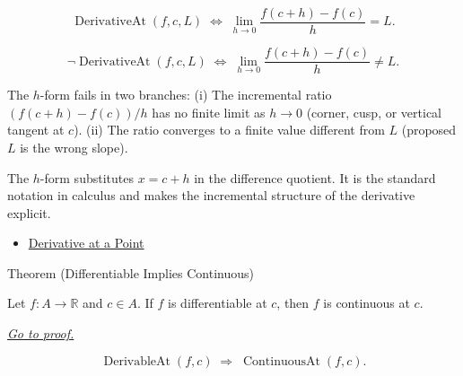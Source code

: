 \begin{remark*}
\[
\operatorname{DerivativeAt}(f,c,L)
\;\Longleftrightarrow\;
\lim_{h\to 0}\frac{f(c+h)-f(c)}{h} = L.
\]
\end{remark*}

\begin{remark*}
\[
\neg\operatorname{DerivativeAt}(f,c,L)
\;\Longleftrightarrow\;
\lim_{h\to 0}\frac{f(c+h)-f(c)}{h} \neq L.
\]
\end{remark*}

\begin{remark*}
The $h$-form fails in two branches: (i) The incremental ratio $(f(c+h)-f(c))/h$ has no finite limit as $h \to 0$ (corner, cusp, or vertical tangent at $c$). (ii) The ratio converges to a finite value different from $L$ (proposed $L$ is the wrong slope).
\end{remark*}

\begin{remark*}[Interpretation]
The $h$-form substitutes $x = c + h$ in the difference quotient. It is the standard notation in calculus and makes the incremental structure of the derivative explicit.
\end{remark*}

\begin{dependencies}
\begin{itemize}
  \item \hyperref[def:derivative-at-a-point]{Derivative at a Point}
\end{itemize}
\end{dependencies}


\begin{theorembox}{Theorem (Differentiable Implies Continuous)}
\begin{theorem}
\label{thm:differentiable-implies-continuous}
Let $f : A \to \mathbb{R}$ and $c \in A$. If $f$ is differentiable at $c$, then $f$ is continuous at $c$.

\smallskip\noindent
\hyperref[prf:differentiable-implies-continuous]{\textit{Go to proof.}}
\end{theorem}
\end{theorembox}

\begin{remark*}
\[
\operatorname{DerivableAt}(f,c) \;\Rightarrow\; \operatorname{ContinuousAt}(f,c).
\]
\end{remark*}

